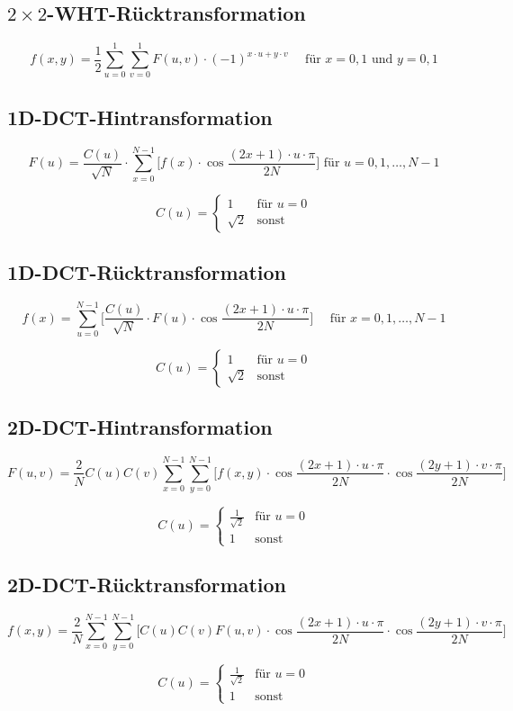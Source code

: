 \subsection*{$2 \times 2$-WHT-Rücktransformation}
\[
    f(x, y) = \frac{1}{2} \sum_{u=0}^{1} \sum_{v=0}^{1} F(u, v) \cdot {(-1)}^{x \cdot u + y \cdot v}
        \quad \mbox{ für } x = 0, 1 \mbox{ und } y = 0, 1
\]

\subsection*{1D-DCT-Hintransformation}
\[
F(u) = \frac{C(u)}{\sqrt{N}}
	\cdot \sum_{x=0}^{N-1} \bigg[ f(x)
	\cdot \cos{\frac{(2x+1) \cdot u \cdot \pi{}}{2N}}
	\bigg] \mbox{  für } u=0,1,\ldots,N-1
\]
	
\[
    C(u) = \begin{cases}
        1 & \text{für } u=0\\
        \sqrt{2} & \text{sonst}
    \end{cases}
\]

\subsection*{1D-DCT-Rücktransformation}
\[
    f(x) = \sum_{u=0}^{N-1} \bigg[ \frac{C(u)}{\sqrt{N}}
	\cdot F(u)
	\cdot \cos{\frac{(2x+1) \cdot u \cdot \pi{}}{2N}}
	\bigg] \quad \mbox{ für } x=0,1,\ldots,N-1
\]
	
\[
    C(u) = \begin{cases}
        1 & \text{für } u=0\\
        \sqrt{2} & \text{sonst}
    \end{cases}
\]

\subsection*{2D-DCT-Hintransformation}
\[
    F(u, v) = \frac{2}{N} C(u) C(v) \sum_{x=0}^{N-1} \sum_{y=0}^{N-1} \bigg[ f(x, y) \cdot 
    \cos \frac{(2x + 1) \cdot u \cdot \pi}{2 N} \cdot \cos \frac{(2y + 1) \cdot v \cdot \pi}{2 N} \bigg]
\]
	
\[
    C(u) = \begin{cases}
        \frac{1}{\sqrt{2}} & \text{für } u=0\\
        1 & \text{sonst}
    \end{cases}
\]

\subsection*{2D-DCT-Rücktransformation}
\[
    f(x, y) = \frac{2}{N} \sum_{x=0}^{N-1} \sum_{y=0}^{N-1} \bigg[ C(u) C(v) F(u, v) \cdot 
    \cos \frac{(2x + 1) \cdot u \cdot \pi}{2 N} \cdot \cos \frac{(2y + 1) \cdot v \cdot \pi}{2 N} \bigg]
\]
	
\[
    C(u) = \begin{cases}
        \frac{1}{\sqrt{2}} & \text{für } u=0\\
        1 & \text{sonst}
    \end{cases}
\]
